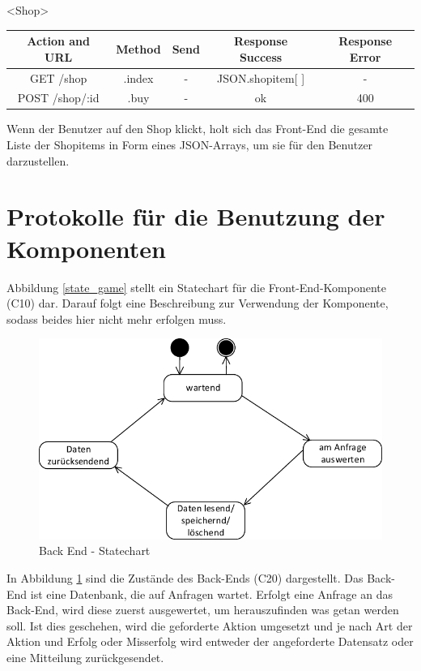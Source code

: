 \begin{interface}{60}{<Shop>}

\begin{center}
	\begin{tabular}[h]{|c|c|c|c|c|}
	\hline
	\textbf{Action and URL} &\textbf {Method} &\textbf {Send} &\textbf {Response Success} & \textbf{Response Error}\\
	\hline
	GET     /shop & .index  & -  & JSON.shopitem[ ] & - \\
	\hline
	\hline
	POST    /shop/:id & .buy & -  & ok & 400 \\
	\hline
	 \end{tabular}
\end{center}

\end{interface}

Wenn der Benutzer auf den Shop klickt, holt sich das Front-End die gesamte Liste der Shopitems in Form eines JSON-Arrays, um sie für den Benutzer darzustellen. 


\newpage
\section{Protokolle für die Benutzung der Komponenten}

Abbildung \ref {state_game} stellt ein Statechart für die Front-End-Komponente (C10) dar. Darauf folgt eine Beschreibung zur Verwendung der Komponente, sodass beides hier nicht mehr erfolgen muss. 

\begin{figure}[ht]
\centering
\includegraphics[width=1\textwidth]{figures/statechart_BE.pdf}
\caption{Back End - Statechart}
\label{be-state}
\end{figure}

In Abbildung \ref {be-state} sind die Zustände des Back-Ends (C20) dargestellt.
Das Back-End ist eine Datenbank, die auf Anfragen wartet. Erfolgt eine Anfrage an das Back-End, wird diese zuerst ausgewertet, um herauszufinden was getan werden soll. Ist dies geschehen, wird die geforderte Aktion umgesetzt und je nach Art der Aktion und Erfolg oder Misserfolg wird entweder der angeforderte Datensatz oder eine Mitteilung zurückgesendet. 


